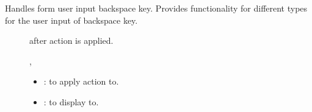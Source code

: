 \documentclass[letterpaper,10pt,english]{sphinxmanual}
\begin{document}
\begin{fulllineitems}
\begin{fulllineitems}
\label{\detokenize{index:_CPPv2N7ostendo9BackspaceE3Var6Window}}%
\pysigstartmultiline
{}\label{\detokenize{index:Pessumnamespaceostendo_1ab4fddb801c2f32c114a4e3ef0c9bc953}}%
\pysigstopmultiline
Handles form user input backspace key. Provides functionality for different {\hyperref[\detokenize{index:Pessumstructostendo_1_1Var}]{}} types for the user input of backspace key. \begin{description}
\item[{}] \leavevmode
{\hyperref[\detokenize{index:Pessumstructostendo_1_1Var}]{}} after action is applied. 

\item[{}] \leavevmode
{\hyperref[\detokenize{index:Pessumstructostendo_1_1Var}]{}}, {\hyperref[\detokenize{index:Pessumclassostendo_1_1Window}]{}} 

\item[{}] \leavevmode\begin{itemize}
\item {} 
: {\hyperref[\detokenize{index:Pessumstructostendo_1_1Var}]{}} to apply action to. 

\item {} 
: {\hyperref[\detokenize{index:Pessumclassostendo_1_1Window}]{}} to display to. 

\end{itemize}

\end{description}


\end{fulllineitems}



\end{fulllineitems}
\end{document}
